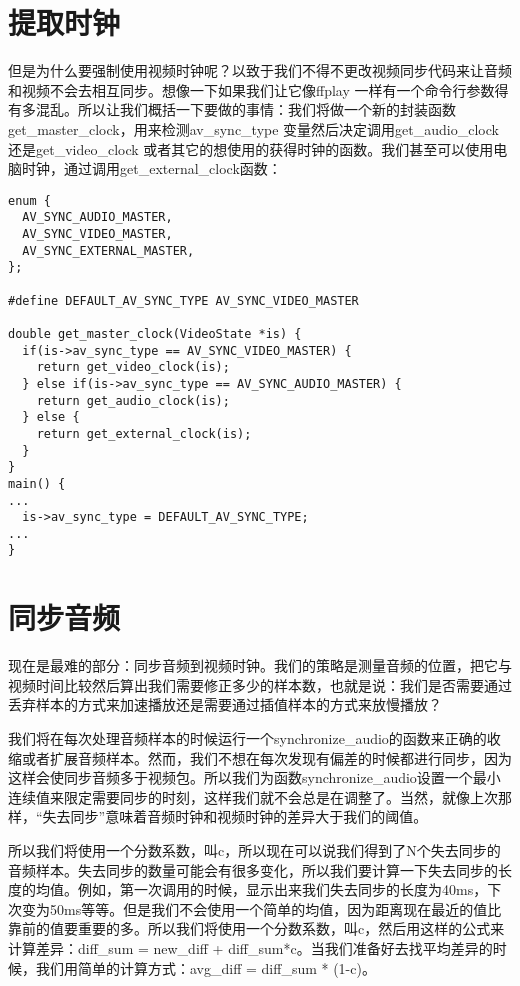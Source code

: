 \section{提取时钟}
但是为什么要强制使用视频时钟呢？以致于我们不得不更改视频同步代码来让音频和视频不会去相互同步。想像一下如果我们让它像ffplay 一样有一个命令行参数得有多混乱。所以让我们概括一下要做的事情：我们将做一个新的封装函数get_master_clock，用来检测av_sync_type 变量然后决定调用get_audio_clock还是get_video_clock 或者其它的想使用的获得时钟的函数。我们甚至可以使用电脑时钟，通过调用get_external_clock函数：

\begin{lstlisting}
enum {
  AV_SYNC_AUDIO_MASTER,
  AV_SYNC_VIDEO_MASTER,
  AV_SYNC_EXTERNAL_MASTER,
};

#define DEFAULT_AV_SYNC_TYPE AV_SYNC_VIDEO_MASTER

double get_master_clock(VideoState *is) {
  if(is->av_sync_type == AV_SYNC_VIDEO_MASTER) {
    return get_video_clock(is);
  } else if(is->av_sync_type == AV_SYNC_AUDIO_MASTER) {
    return get_audio_clock(is);
  } else {
    return get_external_clock(is);
  }
}
main() {
...
  is->av_sync_type = DEFAULT_AV_SYNC_TYPE;
...
}
\end{lstlisting}

\section{同步音频}

现在是最难的部分：同步音频到视频时钟。我们的策略是测量音频的位置，把它与视频时间比较然后算出我们需要修正多少的样本数，也就是说：我们是否需要通过丢弃样本的方式来加速播放还是需要通过插值样本的方式来放慢播放？

我们将在每次处理音频样本的时候运行一个synchronize_audio的函数来正确的收缩或者扩展音频样本。然而，我们不想在每次发现有偏差的时候都进行同步，因为这样会使同步音频多于视频包。所以我们为函数synchronize_audio设置一个最小连续值来限定需要同步的时刻，这样我们就不会总是在调整了。当然，就像上次那样，“失去同步”意味着音频时钟和视频时钟的差异大于我们的阈值。

所以我们将使用一个分数系数，叫c，所以现在可以说我们得到了N个失去同步的音频样本。失去同步的数量可能会有很多变化，所以我们要计算一下失去同步的长度的均值。例如，第一次调用的时候，显示出来我们失去同步的长度为40ms，下次变为50ms等等。但是我们不会使用一个简单的均值，因为距离现在最近的值比靠前的值要重要的多。所以我们将使用一个分数系数，叫c，然后用这样的公式来计算差异：diff_sum = new_diff + diff_sum*c。当我们准备好去找平均差异的时候，我们用简单的计算方式：avg_diff = diff_sum * (1-c)。

